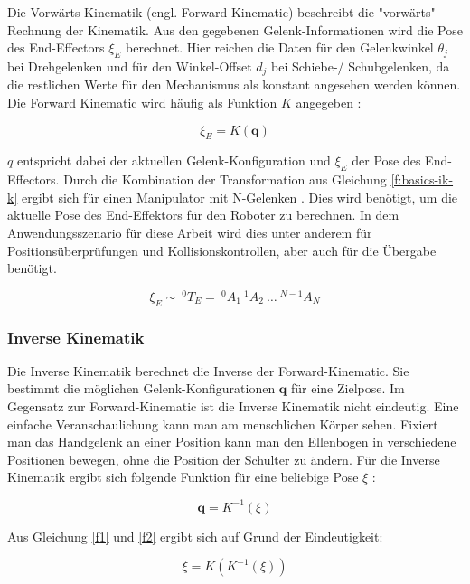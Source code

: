 Die Vorwärts-Kinematik (engl. Forward Kinematic) beschreibt die "vorwärts"  Rechnung der Kinematik. Aus den gegebenen Gelenk-Informationen wird die Pose des End-Effectors $\xi_E$ berechnet. Hier reichen die Daten für den Gelenkwinkel $\theta_j$ bei Drehgelenken und für den Winkel-Offset $d_j$ bei Schiebe-/ Schubgelenken, da die restlichen Werte für den Mechanismus als konstant angesehen werden können. Die Forward Kinematic wird häufig als Funktion $K$ angegeben \citep{Corke2011}:

\begin{equation}
\xi_E = K(\textbf{q})
\label{f1}
\end{equation}

$q$ entspricht dabei der aktuellen Gelenk-Konfiguration und $\xi_E$ der Pose des End-Effectors. Durch die Kombination der Transformation aus Gleichung \ref{f:basics-ik-k} ergibt sich für einen Manipulator mit N-Gelenken  \citep{Corke2011}. Dies wird benötigt, um die aktuelle Pose des End-Effektors für den Roboter zu berechnen. In dem Anwendungsszenario für diese Arbeit wird dies unter anderem für Positionsüberprüfungen und Kollisionskontrollen, aber auch für die Übergabe benötigt.

\begin{equation}
\xi_E \sim \: ^0T_E =\: ^0A_1\:^1A_2 \:\dots\:^{N-1}A_N
\end{equation}

\subsubsection{Inverse Kinematik}

Die Inverse Kinematik berechnet die Inverse der Forward-Kinematic. Sie bestimmt die möglichen Gelenk-Konfigurationen $\textbf{q}$ für eine Zielpose. Im Gegensatz zur Forward-Kinematic ist die Inverse Kinematik nicht eindeutig. Eine einfache Veranschaulichung kann man am menschlichen Körper sehen. Fixiert man das Handgelenk an einer Position kann man den Ellenbogen in verschiedene Positionen bewegen, ohne die Position der Schulter zu ändern. Für die Inverse Kinematik ergibt sich folgende Funktion für eine beliebige Pose $\xi$ \citep{Corke2011}:


\begin{equation}
\textbf{q} = K^{-1}(\xi)
\label{f2}
\end{equation}

Aus Gleichung \ref{f1} und \ref{f2} ergibt sich auf Grund der Eindeutigkeit:

\begin{displaymath}
\xi = K(K^{-1}(\xi))
\end{displaymath}

